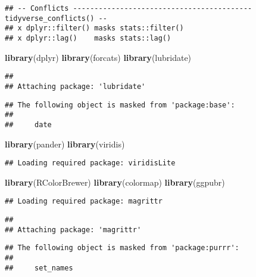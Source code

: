 \documentclass[]{article}
\newenvironment{Shaded}{\begin{snugshade}}{\end{snugshade}}
\newcommand{\KeywordTok}[1]{\textcolor[rgb]{0.13,0.29,0.53}{\textbf{#1}}}
\newcommand{\NormalTok}[1]{#1}
\begin{document}
\begin{verbatim}
## -- Conflicts ------------------------------------------ tidyverse_conflicts() --
## x dplyr::filter() masks stats::filter()
## x dplyr::lag()    masks stats::lag()
\end{verbatim}

\begin{Shaded}
\begin{Highlighting}[]
\KeywordTok{library}\NormalTok{(dplyr)}
\KeywordTok{library}\NormalTok{(forcats)}
\KeywordTok{library}\NormalTok{(lubridate)}
\end{Highlighting}
\end{Shaded}

\begin{verbatim}
## 
## Attaching package: 'lubridate'
\end{verbatim}

\begin{verbatim}
## The following object is masked from 'package:base':
## 
##     date
\end{verbatim}

\begin{Shaded}
\begin{Highlighting}[]
\KeywordTok{library}\NormalTok{(pander)}
\KeywordTok{library}\NormalTok{(viridis)}
\end{Highlighting}
\end{Shaded}

\begin{verbatim}
## Loading required package: viridisLite
\end{verbatim}

\begin{Shaded}
\begin{Highlighting}[]
\KeywordTok{library}\NormalTok{(RColorBrewer)}
\KeywordTok{library}\NormalTok{(colormap)}
\KeywordTok{library}\NormalTok{(ggpubr)}
\end{Highlighting}
\end{Shaded}

\begin{verbatim}
## Loading required package: magrittr
\end{verbatim}

\begin{verbatim}
## 
## Attaching package: 'magrittr'
\end{verbatim}

\begin{verbatim}
## The following object is masked from 'package:purrr':
## 
##     set_names
\end{verbatim}
\end{document}
